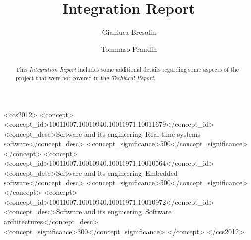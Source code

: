 \documentclass[sigconf, screen]{acmart}
\begin{document}
\title{Integration Report}

\author{Gianluca Bresolin}

\author{Tommaso Prandin}


\begin{abstract}
  This \textit{Integration Report} includes some additional details regarding
  some aspects of the project that were not covered in the \textit{Techincal
  Report}. 
\end{abstract}

\begin{CCSXML}
<ccs2012>
   <concept>
       <concept_id>10011007.10010940.10010971.10011679</concept_id>
       <concept_desc>Software and its engineering~Real-time systems software</concept_desc>
       <concept_significance>500</concept_significance>
       </concept>
   <concept>
       <concept_id>10011007.10010940.10010971.10010564</concept_id>
       <concept_desc>Software and its engineering~Embedded software</concept_desc>
       <concept_significance>500</concept_significance>
       </concept>
   <concept>
       <concept_id>10011007.10010940.10010971.10010972</concept_id>
       <concept_desc>Software and its engineering~Software architectures</concept_desc>
       <concept_significance>300</concept_significance>
       </concept>
 </ccs2012>
\end{CCSXML}
\end{document}
